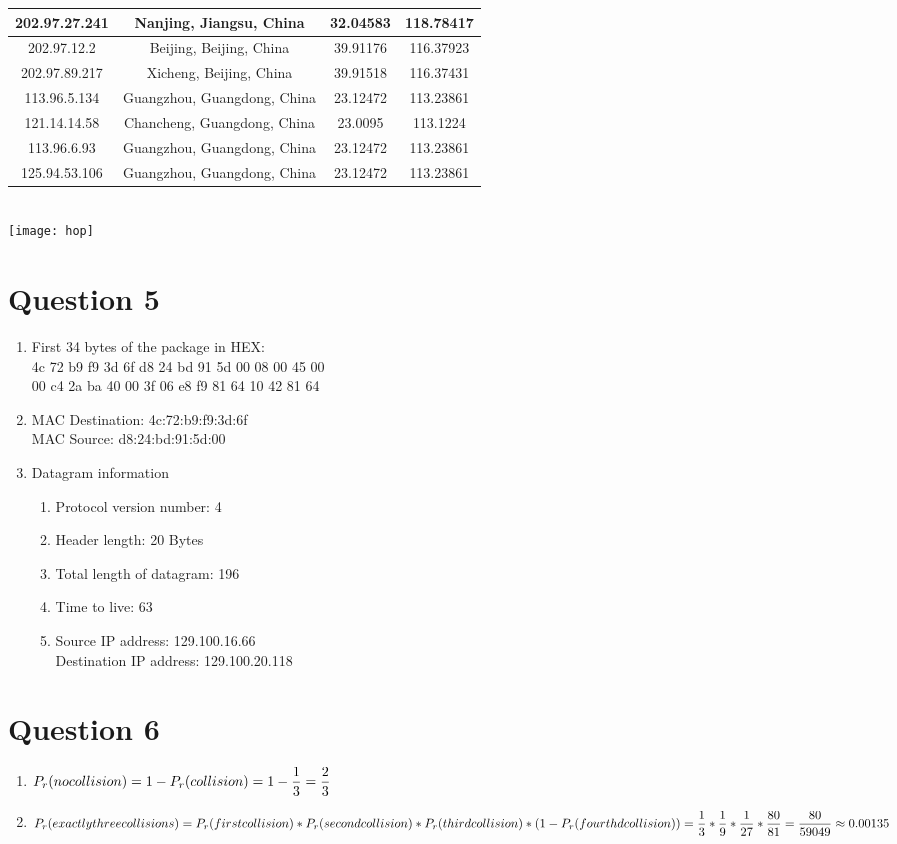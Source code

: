 \documentclass[12pt,letterpaper]{article}
\begin{document}
\begin{tabular}{ |c|c|c|c| }
 	\hline 
 	202.97.27.241 & Nanjing, Jiangsu, China & 32.04583 & 118.78417 \\ 
 	\hline 
 	202.97.12.2 & Beijing, Beijing, China & 39.91176
 & 116.37923 \\
 	\hline 
 	202.97.89.217 & Xicheng, Beijing, China & 39.91518 & 116.37431 \\
 	\hline 
 	113.96.5.134 & Guangzhou, Guangdong, China & 23.12472 & 113.23861 \\ 
 	\hline 
 	121.14.14.58 & Chancheng, Guangdong, China & 23.0095 & 113.1224 \\ 
 	\hline 
 	113.96.6.93 & Guangzhou, Guangdong, China & 23.12472 & 113.23861 \\
 	\hline 
 	125.94.53.106 & Guangzhou, Guangdong, China & 23.12472 & 113.23861 \\
 	\hline 
 	
\end{tabular} \\
\texttt{[image: hop]}

\section*{Question 5}
\begin{enumerate}
	\item First 34 bytes of the package in HEX: \\
			4c 72 b9 f9 3d 6f d8 24 bd 91 5d 00 08 00 45 00 \\
			00 c4 2a ba 40 00 3f 06 e8 f9 81 64 10 42 81 64
	\item MAC Destination: 4c:72:b9:f9:3d:6f \\
			MAC Source: d8:24:bd:91:5d:00
	\item Datagram information
	\begin{enumerate}
		\item Protocol version number: 4
		\item Header length: 20 Bytes
		\item Total length of datagram: 196
		\item Time to live: 63
		\item Source IP address: 129.100.16.66 \\
				Destination IP address: 129.100.20.118
	\end{enumerate}
\end{enumerate}

\section*{Question 6}
\begin{enumerate}
	\item $P_{r}(nocollision)=1-P_{r}(collision) \\
	=1-\dfrac{1}{3} \\
	=\dfrac{2}{3}$
	\item $P_{r}(exactlythreecollisions)=P_{r}(firstcollision)*P_{r}(secondcollision)*P_{r}(thirdcollision)*(1-P_{r}(fourthdcollision))\\
	=\dfrac{1}{3}*\dfrac{1}{9}*\dfrac{1}{27} *\dfrac{80}{81}\\
	=\dfrac{80}{59049}\approx0.00135$
\end{enumerate}
\end{document}
